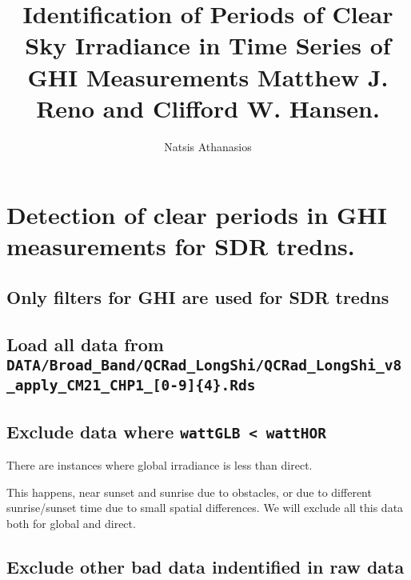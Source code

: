 \documentclass[
  10pt,
  a4paper,oneside]{article}
\title{Identification of Periods of Clear Sky Irradiance in Time Series of GHI Measurements Matthew J. Reno and Clifford W. Hansen.}
\author{Natsis Athanasios}
\date{}
\begin{document}
\maketitle

{
\hypersetup{linkcolor=}
\setcounter{tocdepth}{4}
\tableofcontents
}
\newpage

\hypertarget{detection-of-clear-periods-in-ghi-measurements-for-sdr-tredns.}{%
\section{Detection of clear periods in GHI measurements for SDR tredns.}\label{detection-of-clear-periods-in-ghi-measurements-for-sdr-tredns.}}

\hypertarget{only-filters-for-ghi-are-used-for-sdr-tredns}{%
\subsection{Only filters for GHI are used for SDR tredns}\label{only-filters-for-ghi-are-used-for-sdr-tredns}}

\hypertarget{load-all-data-from-databroad_bandqcrad_longshiqcrad_longshi_v8_apply_cm21_chp1_0-94.rds}{%
\subsection{\texorpdfstring{Load all data from \texttt{DATA/Broad\_Band/QCRad\_LongShi/QCRad\_LongShi\_v8\_apply\_CM21\_CHP1\_{[}0-9{]}\{4\}.Rds}}{Load all data from DATA/Broad\_Band/QCRad\_LongShi/QCRad\_LongShi\_v8\_apply\_CM21\_CHP1\_{[}0-9{]}\{4\}.Rds}}\label{load-all-data-from-databroad_bandqcrad_longshiqcrad_longshi_v8_apply_cm21_chp1_0-94.rds}}

\hypertarget{exclude-data-where-wattglb-watthor}{%
\subsection{\texorpdfstring{Exclude data where \texttt{wattGLB\ \textless{}\ wattHOR}}{Exclude data where wattGLB \textless{} wattHOR}}\label{exclude-data-where-wattglb-watthor}}

There are instances where global irradiance is less than direct.

This happens, near sunset and sunrise due to obstacles,
or due to different sunrise/sunset time due to small spatial differences.
We will exclude all this data both for global and direct.

\hypertarget{exclude-other-bad-data-indentified-in-raw-data}{%
\subsection{Exclude other bad data indentified in raw data}\label{exclude-other-bad-data-indentified-in-raw-data}}
\end{document}
